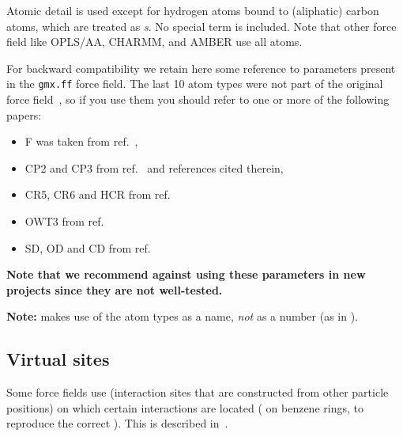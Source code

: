 Atomic detail is used except for hydrogen atoms bound to (aliphatic)
carbon atoms, which are treated as {\em {}s}. No
special  term is included. Note that other force field
like OPLS/AA, CHARMM, and AMBER use all atoms.

For backward compatibility we retain here some reference to parameters
present in the {\tt gmx.ff} force field. The last 10 atom types were
not part of the original  force field~\cite{biomos}, so
if you use them you should refer to one or more of the following
papers:
\begin{itemize}
\item F was taken from ref.~\cite{Buuren93a}, 
\item CP2 and CP3 from ref.~\cite{Buuren93b} and references cited therein, 
\item CR5, CR6 and HCR from ref.~\cite{Spoel96c}
\item OWT3 from ref.~\cite{Jorgensen83}
\item SD, OD and CD from ref.~\cite{Liu95}
\end{itemize}
{\bf Note that we recommend against using these parameters in new projects
since they are not well-tested.}

{\bf Note:} {\gromacs} makes use of the atom types as a name, {\em
not} as a number (as {\eg} in {\gromos}).

%
%

\subsection{Virtual sites}
\label{sec:vsitetop}
Some force fields use 
(interaction sites that are constructed from other particle positions)
on which certain interactions are located
({\eg} on benzene rings, to reproduce the correct
). This is described in~.

